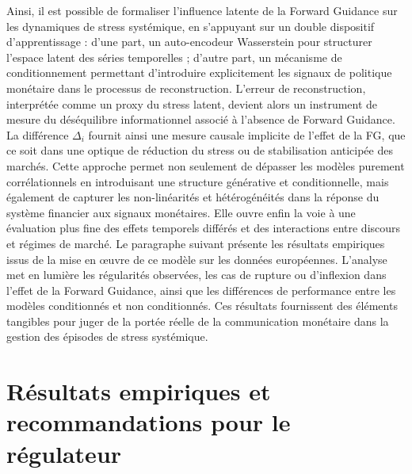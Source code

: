 Ainsi, il est possible de formaliser l’influence latente de la Forward Guidance sur les dynamiques de stress systémique, en s’appuyant sur un double dispositif d’apprentissage : d’une part, un auto-encodeur Wasserstein pour structurer l’espace latent des séries temporelles ; d’autre part, un mécanisme de conditionnement permettant d’introduire explicitement les signaux de politique monétaire dans le processus de reconstruction. L’erreur de reconstruction, interprétée comme un proxy du stress latent, devient alors un instrument de mesure du déséquilibre informationnel associé à l’absence de Forward Guidance. La différence $\Delta_i$ fournit ainsi une mesure causale implicite de l’effet de la FG, que ce soit dans une optique de réduction du stress ou de stabilisation anticipée des marchés. Cette approche permet non seulement de dépasser les modèles purement corrélationnels en introduisant une structure générative et conditionnelle, mais également de capturer les non-linéarités et hétérogénéités dans la réponse du système financier aux signaux monétaires. Elle ouvre enfin la voie à une évaluation plus fine des effets temporels différés et des interactions entre discours et régimes de marché. Le paragraphe suivant présente les résultats empiriques issus de la mise en œuvre de ce modèle sur les données européennes. L’analyse met en lumière les régularités observées, les cas de rupture ou d’inflexion dans l’effet de la Forward Guidance, ainsi que les différences de performance entre les modèles conditionnés et non conditionnés. Ces résultats fournissent des éléments tangibles pour juger de la portée réelle de la communication monétaire dans la gestion des épisodes de stress systémique.
 
\section{Résultats empiriques et recommandations pour le régulateur}

